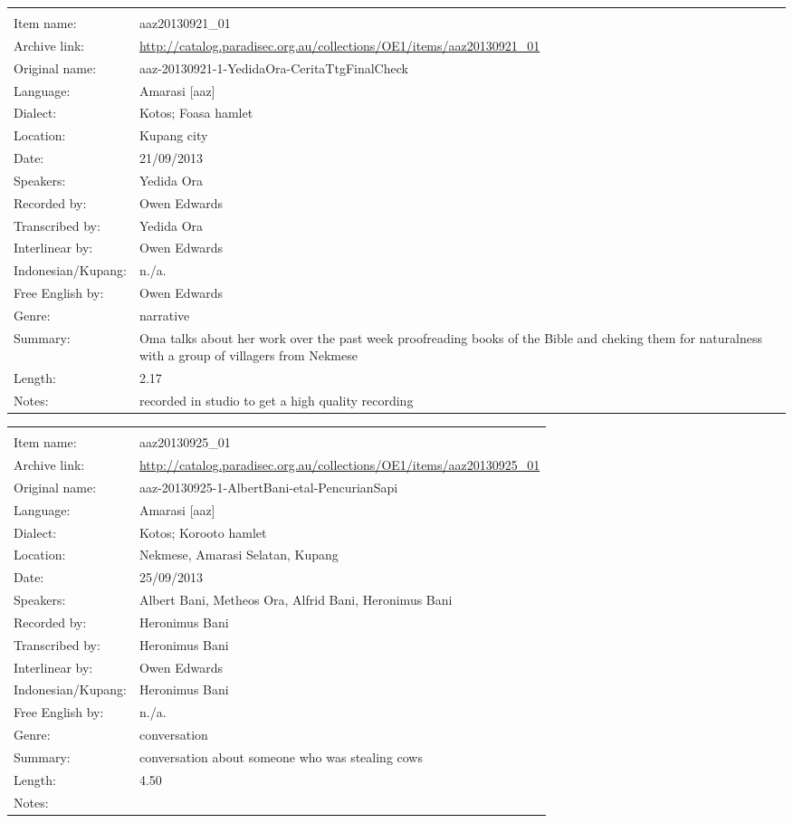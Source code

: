 \newpage
\noindent
\wg\begin{tabular}{lL{.67\textwidth}}
			& \\
Item name:			& aaz20130921{\_}01\\
Archive link:			& \url{http://catalog.paradisec.org.au/collections/OE1/items/aaz20130921_01}\\
Original name:			& aaz-20130921-1-YedidaOra-CeritaTtgFinalCheck\\
Language:				& Amarasi [aaz] \\
Dialect:				& Kotos; Fo{\Q}asa{\Q} hamlet \\
Location:				& Kupang city\\
Date:				& 21/09/2013\\
Speakers:				& Yedida Ora\\
Recorded by:			& Owen Edwards\\
Transcribed by:		& Yedida Ora\\
Interlinear by:		& Owen Edwards \\
Indonesian/Kupang:		& n./a.\\
Free English by:		& Owen Edwards\\
Genre:				& narrative\\
Summary:				& Oma talks about her work over the past week proofreading books
						of the Bible and cheking them for naturalness
						with a group of villagers from Nekmese{\Q}\\
Length:				& 2.17\\
Notes:				& recorded in studio to get a high quality recording\\
\end{tabular}

\newpage
\noindent
\wg\begin{tabular}{lL{.67\textwidth}}
			& \\
Item name:			& aaz20130925{\_}01\\
Archive link:			& \url{http://catalog.paradisec.org.au/collections/OE1/items/aaz20130925_01}\\
Original name:			& aaz-20130925-1-AlbertBani-etal-PencurianSapi\\
Language:				& Amarasi [aaz] \\
Dialect:				& Kotos; Koro{\Q}oto hamlet \\
Location:				& Nekmese{\Q}, Amarasi Selatan, Kupang \\
Date:				& 25/09/2013\\
Speakers:				& Albert Bani, Metheos Ora, Alfrid Bani, Heronimus Bani\\
Recorded by:			& Heronimus Bani\\
Transcribed by:		& Heronimus Bani\\
Interlinear by:		& Owen Edwards \\
Indonesian/Kupang:		& Heronimus Bani\\
Free English by:		& n./a.\\
Genre:				& conversation\\
Summary:				& conversation about someone who was stealing cows\\
Length:				& 4.50\\
Notes:				& \\
\end{tabular}

